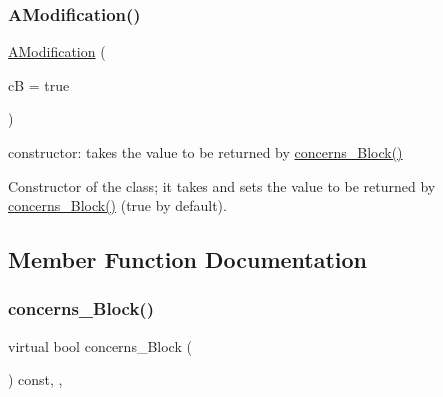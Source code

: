 \subsubsection{\texorpdfstring{A\+Modification()}{AModification()}}
{\footnotesize\ttfamily \mbox{\hyperlink{class_s_m_spp__di__unipi__it_1_1_a_modification}{A\+Modification}} (\begin{DoxyParamCaption}\item[{const bool}]{cB = {\ttfamily true} }\end{DoxyParamCaption})\hspace{0.3cm}{\ttfamily [inline]}}



constructor\+: takes the value to be returned by \mbox{\hyperlink{class_s_m_spp__di__unipi__it_1_1_modification_a22fe0cccfc755cfd89b240587d1f1cad}{concerns\+\_\+\+Block()}} 

Constructor of the class; it takes and sets the value to be returned by \mbox{\hyperlink{class_s_m_spp__di__unipi__it_1_1_modification_a22fe0cccfc755cfd89b240587d1f1cad}{concerns\+\_\+\+Block()}} (true by default). 

\subsection{Member Function Documentation}
\mbox{\label{class_s_m_spp__di__unipi__it_1_1_a_modification_af4b7df5d253c1ae7a94759df4ac83113}} 
\subsubsection{\texorpdfstring{concerns\+\_\+\+Block()}{concerns\_Block()}}
{\footnotesize\ttfamily virtual bool concerns\+\_\+\+Block (\begin{DoxyParamCaption}\item[{void}]{ }\end{DoxyParamCaption}) const\hspace{0.3cm}{\ttfamily [inline]}, {\ttfamily [override]}, {\ttfamily [virtual]}}



